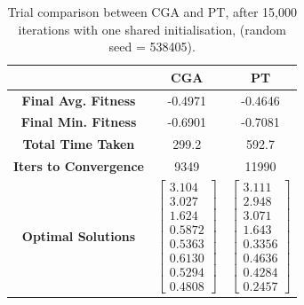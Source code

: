 \documentclass[10pt]{article}
\begin{document}
\begin{multicols}{2}
\begin{table}[H]
    \centering
    \begin{tabular}{|c|c|c|}
    \hline
    & \textbf{CGA} & \textbf{PT} \\
    \hline
    \textbf{Final Avg. Fitness} & -0.4971 & -0.4646 \\
    \hline
    \textbf{Final Min. Fitness} & -0.6901 & -0.7081 \\
    \hline
    \textbf{Total Time Taken} & 299.2 & 592.7 \\
    \hline
    \textbf{Iters to Convergence} & 9349 & 11990 \\
    \hline
    \textbf{Optimal Solutions} & $\begin{bmatrix} 3.104 \\ 3.027 \\ 1.624 \\ 0.5872 \\ 0.5363 \\ 0.6130 \\ 0.5294 \\ 0.4808 \end{bmatrix}$ & $\begin{bmatrix} 3.111 \\ 2.948 \\ 3.071 \\ 1.643 \\ 0.3356 \\ 0.4636 \\ 0.4284 \\ 0.2457 \end{bmatrix}$ \\
    \hline
    \end{tabular}
    \captionsetup{justification=centering}
    \caption{Trial comparison between CGA and PT, after 15,000 iterations with one shared initialisation, (random seed = 538405).}
    \label{tab:trial_comparison}
\end{table}


\end{multicols}
\end{document}
